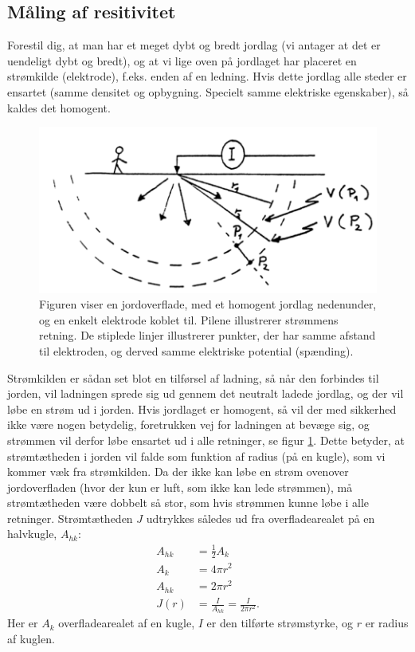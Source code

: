 \subsection{Måling af resitivitet}
Forestil dig, at man har et meget dybt og bredt jordlag (vi antager at det er uendeligt dybt og bredt), og at vi lige oven på jordlaget har placeret en strømkilde (elektrode), f.eks. enden af en ledning.
Hvis dette jordlag alle steder er ensartet (samme densitet og opbygning. Specielt samme elektriske egenskaber), så kaldes det homogent. \\
%
\begin{figure}
	\centering
	\includegraphics[width=\textwidth]{Geo/Figurer/halvcirkel.png}
	\caption{Figuren viser en jordoverflade, med et homogent jordlag nedenunder, og en enkelt elektrode koblet til. Pilene illustrerer strømmens retning. De stiplede linjer illustrerer punkter, der har samme afstand til elektroden, og derved samme elektriske potential (spænding).}
	\label{fig:geo_halvcirkel}
\end{figure}
Strømkilden er sådan set blot en tilførsel af ladning, så når den forbindes til jorden, vil ladningen sprede sig ud gennem det neutralt ladede jordlag, og der vil løbe en strøm ud i jorden. Hvis jordlaget er homogent, så vil der med sikkerhed ikke være nogen betydelig, foretrukken vej for ladningen at bevæge sig, og strømmen vil derfor løbe ensartet ud i alle retninger, se figur \ref{fig:geo_halvcirkel}. Dette betyder, at strømtætheden i jorden vil falde som funktion af radius (på en kugle), som vi kommer væk fra strømkilden. Da der ikke kan løbe en strøm ovenover jordoverfladen (hvor der kun er luft, som ikke kan lede strømmen), må strømtætheden være dobbelt så stor, som hvis strømmen kunne løbe i alle retninger. Strømtætheden $J$ udtrykkes således ud fra overfladearealet på en halvkugle, $A_{hk}$:
\begin{align}
    A_{hk} &= \frac{1}{2} A_k \\
    A_k &= 4\pi r^2 \\
    A_{hk} &= 2\pi r^2 \\
    J(r) &= \frac{I}{A_{hk}} = \frac{I}{2\pi r^2}.\label{eq:geo_Jr}
\end{align}
Her er $A_k$ overfladearealet af en kugle, $I$ er den tilførte strømstyrke, og $r$ er radius af kuglen. \\

